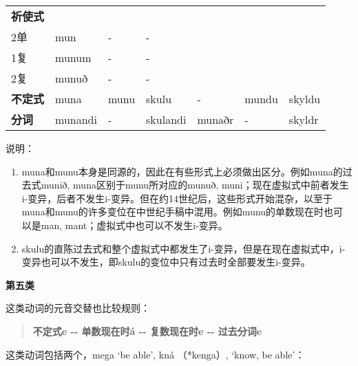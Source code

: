 \begin{longtable}{lllllll}
  \textbf{祈使式} & ~                        & ~                        & ~        & ~      & ~      & ~       \\
  2单             & mun                      & -                        & -        & ~      & ~      & ~       \\
  1复             & munum                    & -                        & -        & ~      & ~      & ~       \\
  2复             & munuð                    & -                        & -        & ~      & ~      & ~       \\
  \textbf{不定式} & muna                     & munu                     & skulu    & -      & mundu  & skyldu  \\
  \textbf{分词}   & munandi                  & -                        & skulandi & munaðr & -      & skyldr  \\
\end{longtable}

说明：

\begin{enumerate}
  \def\labelenumi{\arabic{enumi})}
  \item
        muna和munu本身是同源的，因此在有些形式上必须做出区分。例如muna的过去式munið,
        muna区别于munu所对应的munuð,
        muni；现在虚拟式中前者发生i-变异，后者不发生i-变异。但在约14世纪后，这些形式开始混杂，以至于muna和munu的许多变位在中世纪手稿中混用。例如munu的单数现在时也可以是man,
        mant；虚拟式中也可以不发生i-变异。
  \item
        skulu的直陈过去式和整个虚拟式中都发生了i-变异，但是在现在虚拟式中，i-变异也可以不发生，即skulu的变位中只有过去时全部要发生i-变异。
\end{enumerate}

\textbf{第五类}

这类动词的元音交替也比较规则：

\begin{quote}
  \textbf{不定式e -\/- 单数现在时á -\/- 复数现在时e -\/- 过去分词e}
\end{quote}

这类动词包括两个，mega `be able‌', kná （*kenga）, `know, be able‌'：

